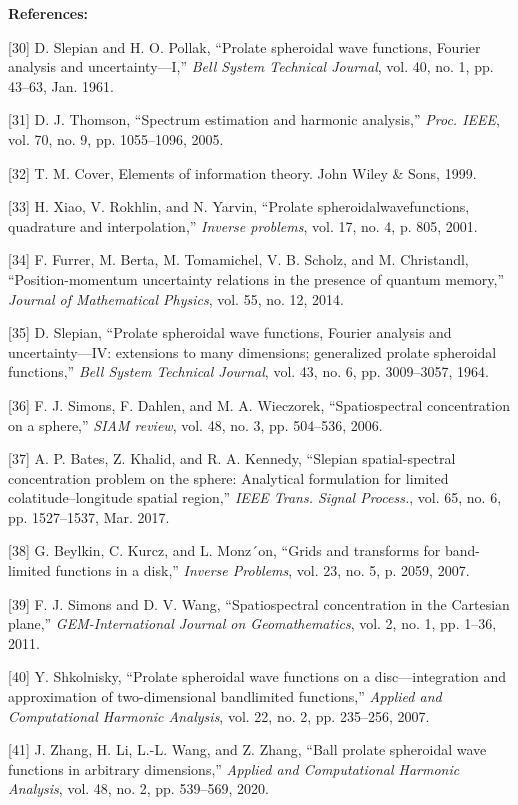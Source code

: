 \documentclass[a4paper,12pt]{article}
\begin{document}
{\color{blue}
	{\bf References:}
	
	[30] D. Slepian and H. O. Pollak, “Prolate spheroidal wave functions, Fourier analysis and uncertainty—I,” {\it Bell System Technical
	Journal}, vol. 40, no. 1, pp. 43–63, Jan. 1961.
	
	[31] D. J. Thomson, “Spectrum estimation and harmonic analysis,” {\it Proc. IEEE}, vol. 70, no. 9, pp. 1055–1096, 2005.
	
	[32] T. M. Cover, Elements of information theory. John Wiley \& Sons, 1999.
	
	[33] H. Xiao, V. Rokhlin, and N. Yarvin, “Prolate spheroidalwavefunctions, quadrature and interpolation,” {\it Inverse problems}, vol. 17,
	no. 4, p. 805, 2001.
	
	[34] F. Furrer, M. Berta, M. Tomamichel, V. B. Scholz, and M. Christandl, “Position-momentum uncertainty relations in the presence
	of quantum memory,” {\it Journal of Mathematical Physics}, vol. 55, no. 12, 2014.
	
	[35] D. Slepian, “Prolate spheroidal wave functions, Fourier analysis and uncertainty—IV: extensions to many dimensions; generalized
	prolate spheroidal functions,” {\it Bell System Technical Journal}, vol. 43, no. 6, pp. 3009–3057, 1964.
	
	[36] F. J. Simons, F. Dahlen, and M. A. Wieczorek, “Spatiospectral concentration on a sphere,” {\it SIAM review}, vol. 48, no. 3, pp. 504–536,
	2006.
	
	[37] A. P. Bates, Z. Khalid, and R. A. Kennedy, “Slepian spatial-spectral concentration problem on the sphere: Analytical formulation
	for limited colatitude–longitude spatial region,” {\it IEEE Trans. Signal Process.}, vol. 65, no. 6, pp. 1527–1537, Mar. 2017.
	
	[38] G. Beylkin, C. Kurcz, and L. Monz´on, “Grids and transforms for band-limited functions in a disk,” {\it Inverse Problems}, vol. 23,
	no. 5, p. 2059, 2007.
	
	[39] F. J. Simons and D. V. Wang, “Spatiospectral concentration in the Cartesian plane,” {\it GEM-International Journal on Geomathematics},
	vol. 2, no. 1, pp. 1–36, 2011.
	
	[40] Y. Shkolnisky, “Prolate spheroidal wave functions on a disc—integration and approximation of two-dimensional bandlimited
	functions,” {\it Applied and Computational Harmonic Analysis}, vol. 22, no. 2, pp. 235–256, 2007.
	
	[41] J. Zhang, H. Li, L.-L. Wang, and Z. Zhang, “Ball prolate spheroidal wave functions in arbitrary dimensions,” {\it Applied and
	Computational Harmonic Analysis}, vol. 48, no. 2, pp. 539–569, 2020.
	
}
\end{document}
